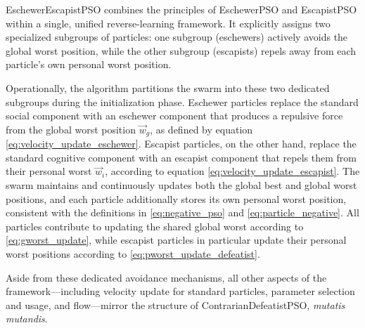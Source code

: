 {EschewerEscapistPSO combines the principles of EschewerPSO and EscapistPSO within a single, unified reverse-learning framework. It explicitly assigns two specialized subgroups of particles: one subgroup (eschewers) actively avoids the global worst position, while the other subgroup (escapists) repels away from each particle’s own personal worst position.

Operationally, the algorithm partitions the swarm into these two dedicated subgroups during the initialization phase. Eschewer particles replace the standard social component with an eschewer component that produces a repulsive force from the global worst position $\vec{w}_g$, as defined by equation \eqref{eq:velocity_update_eschewer}. Escapist particles, on the other hand, replace the standard cognitive component with an escapist component that repels them from their personal worst $\vec{w}_i$, according to equation \eqref{eq:velocity_update_escapist}.
The swarm maintains and continuously updates both the global best and global worst positions, and each particle additionally stores its own personal worst position, consistent with the definitions in \eqref{eq:negative_pso} and \eqref{eq:particle_negative}. All particles contribute to updating the shared global worst according to \eqref{eq:gworst_update}, while escapist particles in particular update their personal worst positions according to \eqref{eq:pworst_update_defeatist}.

Aside from these dedicated avoidance mechanisms, all other aspects of the frame\-work---including velocity update for standard particles, parameter selection and usage, and flow---mirror the structure of ContrarianDefeatistPSO, \textit{mutatis mutandis}.

}
